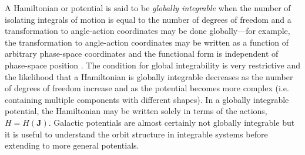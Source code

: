 A Hamiltonian or potential is said to be \emph{globally integrable} when the number of isolating integrals of motion is equal to the number of degrees of freedom and a transformation to angle-action coordinates may be done globally---for example, the transformation to angle-action coordinates may be written as a function of arbitrary phase-space coordinates and the functional form is independent of phase-space position \citep[e.g.,][]{goldstein80}. The condition for global integrability is very restrictive and the likelihood that a Hamiltonian is globally integrable decreases as the number of degrees of freedom increase \citep[e.g.,][]{lichtenberg83} and as the potential becomes more complex (i.e. containing multiple components with different shapes). In a globally integrable potential, the Hamiltonian may be written solely in terms of the actions, $H = H(\boldsymbol{J})$. Galactic potentials are almost certainly not globally integrable but it is useful to understand the orbit structure in integrable systems before extending to more general potentials. 

